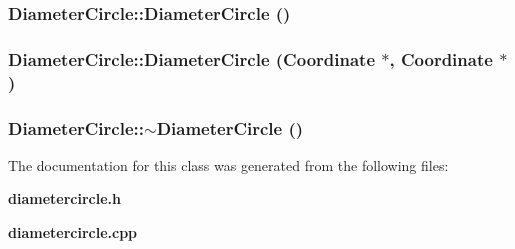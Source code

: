 \subsubsection{\setlength{\rightskip}{0pt plus 5cm}Diameter\-Circle::Diameter\-Circle ()}\label{classDiameterCircle_a0}


\subsubsection{\setlength{\rightskip}{0pt plus 5cm}Diameter\-Circle::Diameter\-Circle ({\bf Coordinate} $\ast$, {\bf Coordinate} $\ast$)}\label{classDiameterCircle_a1}


\subsubsection{\setlength{\rightskip}{0pt plus 5cm}Diameter\-Circle::$\sim$Diameter\-Circle ()}\label{classDiameterCircle_a2}




The documentation for this class was generated from the following files:\begin{CompactItemize}
\item 
{\bf diametercircle.h}\item 
{\bf diametercircle.cpp}\end{CompactItemize}
